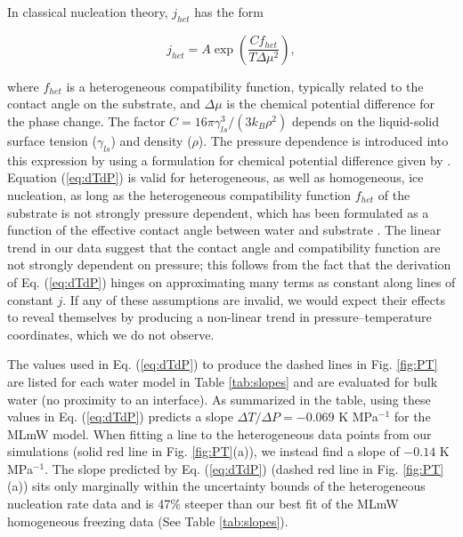 \documentclass[journal abbreviation, manuscript]{copernicus}
\begin{document}
In classical nucleation theory, $j_{het}$ has the form

\begin{equation} \label{eq:R}
    j_{het} = A \exp \! \left(\frac{C f_{het}}{T\Delta \mu ^2} \right),
\end{equation}

\noindent where $f_{het}$ is a heterogeneous compatibility function, typically related to the contact angle on the substrate, and $\Delta \mu$ is the chemical potential difference for the phase change. The factor $C = 16 \pi \gamma_{ls}^3 / (3 k_B \rho^2)$ depends on the liquid-solid surface tension ($\gamma_{ls}$) and density ($\rho$). The pressure dependence is introduced into this expression by using a formulation for chemical potential difference given by \citet{nemec2013}.
Equation (\ref{eq:dTdP}) is valid for heterogeneous, as well as homogeneous, ice nucleation, as long as the heterogeneous compatibility function $f_{het}$ of the substrate is not strongly pressure dependent, which has been formulated as a function of the effective contact angle between water and substrate \citep{lamb2011physics, zobrist2007}. The linear trend in our data suggest that the contact angle and compatibility function are not strongly dependent on pressure; this follows from the fact that the derivation of Eq. (\ref{eq:dTdP}) hinges on approximating many terms as constant along lines of constant $j$. If any of these assumptions are invalid, we would expect their effects to reveal themselves by producing a non-linear trend in pressure--temperature coordinates, which we do not observe.  

The values used in Eq. (\ref{eq:dTdP}) to produce the dashed lines in Fig. \ref{fig:PT} are listed for each water model in Table \ref{tab:slopes} and are evaluated for bulk water (no proximity to an interface). As summarized in the table, using these values in Eq. (\ref{eq:dTdP}) predicts a slope $\Delta T/\Delta P = -0.069$ K MPa$^{-1}$ for the MLmW model. When fitting a line to the heterogeneous data points from our simulations (solid red line in Fig. \ref{fig:PT}(a)), we instead find a slope of $-0.14$ K MPa$^{-1}$. The slope predicted by Eq. (\ref{eq:dTdP}) (dashed red line in Fig. \ref{fig:PT}(a)) sits only marginally within the uncertainty bounds of the heterogeneous nucleation rate data and is 47\% steeper than our best fit of the MLmW homogeneous freezing data (See Table \ref{tab:slopes}).
\end{document}
